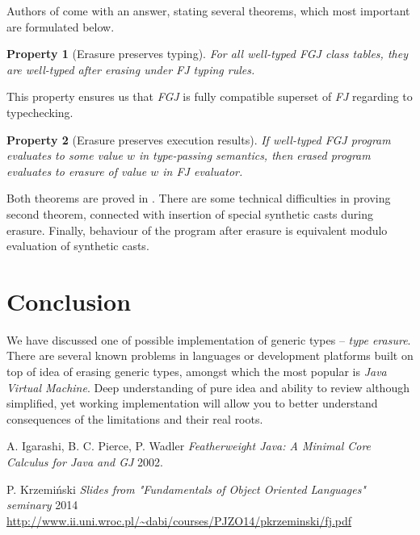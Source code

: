 \documentclass{article}[12pt]
\begin{document}
Authors of \cite{fj} come with an answer, stating several theorems,
which most important are formulated below.
\newtheorem{theorem}{Property}
\begin{theorem}[Erasure preserves typing]
For all well-typed \emph{FGJ} class tables, they are well-typed
after erasing under \emph{FJ} typing rules.
\end{theorem}
This property ensures us that \emph{FGJ} is fully compatible
superset of \emph{FJ} regarding to typechecking.

\begin{theorem}[Erasure preserves execution results]
If well-typed \emph{FGJ} program evaluates to some value $w$
in type-passing semantics, then erased program evaluates to
erasure of value $w$ in \emph{FJ} evaluator.
\end{theorem}

Both theorems are proved in \cite{fj}. There are some technical
difficulties in proving second theorem, connected with insertion
of special synthetic casts during erasure. Finally, behaviour of
the program after erasure is equivalent modulo evaluation of
synthetic casts.

\section{Conclusion}

We have discussed one of possible implementation of generic
types -- \emph{type erasure}. There are several known problems
in languages or development platforms built on top of idea
of erasing generic types, amongst which the most popular is
\emph{Java Virtual Machine}. Deep understanding of pure idea and
ability to review although simplified, yet working implementation
will allow you to better understand consequences of the limitations
and their real roots. 

\begin{thebibliography}{1}

   A. Igarashi, B. C. Pierce, P. Wadler
  {\em Featherweight Java: A Minimal Core Calculus for Java and GJ}
  2002.

   P. Krzemiński {\em Slides from "Fundamentals of
  Object Oriented Languages" seminary} 2014 \\
  \url{http://www.ii.uni.wroc.pl/~dabi/courses/PJZO14/pkrzeminski/fj.pdf}


\end{thebibliography}
\end{document}
